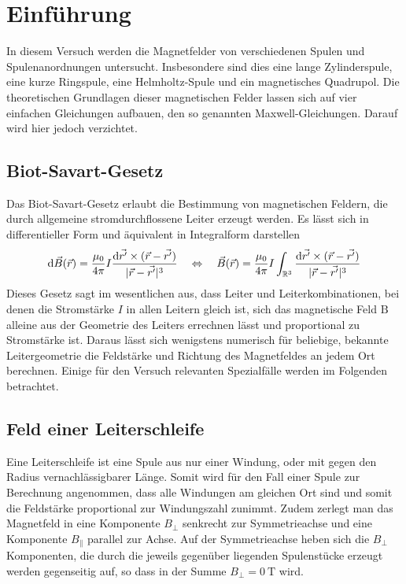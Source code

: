 \section{Einführung}
In diesem Versuch werden die Magnetfelder von verschiedenen Spulen und Spulenanordnungen untersucht. Insbesondere sind dies eine lange Zylinderspule, eine kurze Ringspule, eine Helmholtz-Spule und ein magnetisches Quadrupol. Die theoretischen Grundlagen dieser magnetischen Felder lassen sich auf vier einfachen Gleichungen aufbauen, den so genannten Maxwell-Gleichungen. Darauf wird hier jedoch verzichtet.
\subsection{Biot-Savart-Gesetz}
Das Biot-Savart-Gesetz erlaubt die Bestimmung von magnetischen Feldern, die durch allgemeine stromdurchflossene Leiter erzeugt werden. Es lässt sich in differentieller Form und äquivalent in Integralform darstellen
\begin{equation}
	\mathrm{d} \vec{B}(\vec{r}) = \frac{\mu_0}{4\pi} I \frac{\mathrm{d}\vec{r'}\times (\vec{r} - \vec{r'})}{|\vec{r} - \vec{r'}|^3} \quad \Leftrightarrow \quad 
	\vec{B}(\vec{r}) = \frac{\mu_0}{4\pi} I \int\nolimits_{\mathbb{R}^3} \frac{\mathrm{d}\vec{r'}\times (\vec{r} - \vec{r'})}{|\vec{r} - \vec{r'}|^3}
\end{equation}
Dieses Gesetz sagt im wesentlichen aus, dass Leiter und Leiterkombinationen, bei denen die Stromstärke $ I $ in allen Leitern gleich ist, sich das magnetische Feld $ \mathrm{B} $ alleine aus der Geometrie des Leiters errechnen lässt und proportional zu Stromstärke ist.
Daraus lässt sich wenigstens numerisch für beliebige, bekannte Leitergeometrie die Feldstärke und Richtung des Magnetfeldes an jedem Ort berechnen. Einige für den Versuch relevanten Spezialfälle werden im Folgenden betrachtet.

\subsection{Feld einer Leiterschleife}
Eine Leiterschleife ist eine Spule aus nur einer Windung, oder mit gegen den Radius vernachlässigbarer Länge. Somit wird für den Fall einer Spule zur Berechnung angenommen, dass alle Windungen am gleichen Ort sind und somit die Feldstärke proportional zur Windungszahl zunimmt. Zudem zerlegt man das Magnetfeld in eine Komponente $ B_\perp $ senkrecht zur Symmetrieachse und eine Komponente $ B_\parallel $ parallel zur Achse. Auf der Symmetrieachse heben sich die $ B_\perp $ Komponenten, die durch die jeweils gegenüber liegenden Spulenstücke erzeugt werden gegenseitig auf, so dass in der Summe $ B_\perp = \SI{0}{\tesla} $ wird. %
